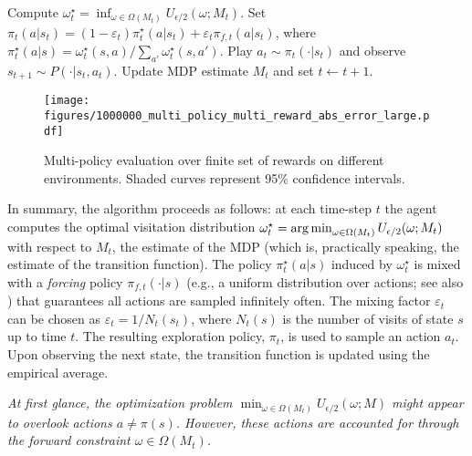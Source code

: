 \begin{algorithm}[t]
	\caption{\mrnas{} \cite{russomulti}}
	\label{algo:mr-nas}
	\begin{algorithmic}[1]
            \STATE Compute $\omega_t^\star= \inf_{\omega \in\Omega(M_t)} U_{\epsilon/2}(\omega; M_t)$.
            \STATE Set $\pi_t(a|s_t) = (1-\varepsilon_t)\pi_t^\star(a|s_t) + \varepsilon_t \pi_{f,t}(a|s_t)$,  where $\pi_t^\star(a|s) = \omega_t^\star(s,a)/\sum_{a'}\omega_t^\star(s,a')$. \label{lst:line:final_policy}
            \STATE Play $a_t\sim \pi_t(\cdot|s_t)$ and observe $s_{t+1}\sim P(\cdot|s_t,a_t)$.
            \STATE Update MDP estimate $M_t$ and set $t\gets t+1$.
            \ENDWHILE{}
	\end{algorithmic}
\end{algorithm}
\begin{figure*}[!b]
    \centering    \texttt{[image: figures/1000000\_multi\_policy\_multi\_reward\_abs\_error\_large.pdf]}
    \caption{Multi-policy evaluation over finite set of rewards on different  environments. Shaded curves represent 95\% confidence intervals.}
    \label{fig:multi_policy_finite_rewards}
\end{figure*}
In summary, the algorithm proceeds as follows: at each time-step $t$ the agent computes the optimal visitation distribution $\omega_t^\star=\operatorname*{arg\,min}_{\omega\in \Omega(M_t)} U_{\epsilon/2}(\omega;M_t)$ with respect to $M_t$, the estimate of the MDP (which is, practically speaking, the estimate of the transition function).  
The  policy $\pi_t^\star(a|s) $ induced by $\omega_t^\star$ is mixed with a \emph{forcing} policy $\pi_{f,t}(\cdot|s)$ (e.g., a uniform distribution over actions; see also \cite{russomulti}) that guarantees all actions are sampled infinitely often.  The mixing factor $\varepsilon_t$ can be chosen as $\varepsilon_t=1/N_t(s_t)$, where $N_t(s)$ is the number of visits of state $s$ up to time $t$. 
The resulting exploration policy, $\pi_t$, is used to sample an action $a_t$. Upon observing the next state, the transition function is updated using the empirical average.
\begin{remark}\label{remark:actions}\it 
   At first glance, the optimization problem $\min_{\omega\in \Omega(M_t)}U_{\epsilon/2}(\omega;M)$ might appear to overlook actions $a\neq\pi(s)$. However, these actions are accounted for through the forward constraint $\omega\in \Omega(M_t)$. %
\end{remark}
